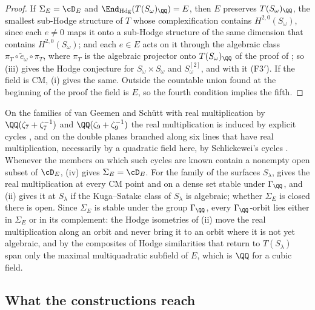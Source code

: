 \begin{proof}
If $\Sigma_{E}=\cD_{E}$ and $\End_{\mathrm{Hdg}}(T(S_{\omega})_{\QQ})=E$, then
$E$ preserves $T(S_{\omega})_{\QQ}$, the smallest sub-Hodge structure of $T$
whose complexification contains $H^{2,0}(S_{\omega})$, since each $e\ne0$
maps it onto a sub-Hodge structure of the same dimension that contains
$H^{2,0}(S_{\omega})$; and each $e\in E$ acts
on it through the algebraic class $\pi_{T}\circ\tilde e_{\omega}\circ\pi_{T}$,
where $\pi_{T}$ is the algebraic projector onto $T(S_{\omega})_{\QQ}$ of the
proof of ; so (iii) gives the Hodge
conjecture for $S_{\omega}\times S_{\omega}$ and $S_{\omega}^{[2]}$, and with
it \textup{(F3$'$)}. If the field is CM, (i) gives the
same. Outside the countable union found at the beginning of the proof the
field is $E$, so the fourth condition implies the fifth.
\end{proof}

On the families of van Geemen and Sch\"utt with real multiplication by
$\QQ(\zeta_{7}+\zeta_{7}^{-1})$ and $\QQ(\zeta_{9}+\zeta_{9}^{-1})$ the
real multiplication is induced by explicit cycles \cite[Theorem~1.2 and
Section~4.8]{vGS25}, and on the double planes branched along six lines that
have real multiplication, necessarily by a quadratic field here, by
Schlickewei's cycles \cite{Sch10,vG08}. Whenever the members on which such
cycles are known contain a nonempty open subset of $\cD_{E}$, (iv) gives
$\Sigma_{E}=\cD_{E}$. For the family of the surfaces $S_{\lambda}$,
 gives the real multiplication at every CM point and on a
dense set stable under $\Gamma_{\QQ}$, and (ii) gives it
at $S_{\lambda}$ if the Kuga--Satake class of $S_{\lambda}$ is algebraic;
whether $\Sigma_{E}$ is closed there is open. Since $\Sigma_{E}$ is stable
under the group $\Gamma_{\QQ}$, every $\Gamma_{\QQ}$-orbit lies either in
$\Sigma_{E}$ or in its complement: the Hodge isometries of (ii) move the real
multiplication along an orbit and never bring it to an orbit where it is not
yet algebraic, and by  the composites of Hodge
similarities that return to $T(S_{\lambda})$ span only the maximal
multiquadratic subfield of $E$, which is $\QQ$ for a cubic field.

\subsection{What the constructions reach}\label{ssec:reach}

